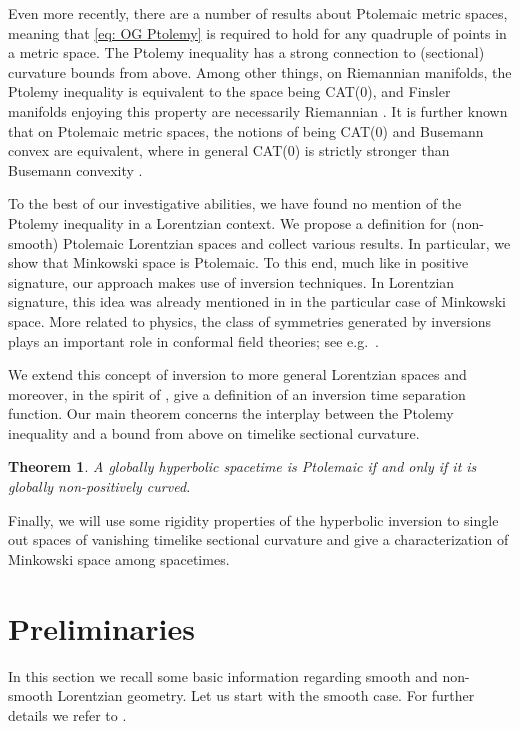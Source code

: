 \documentclass[hidelinks,12pt,a4paper]{article}
\numberwithin{equation}{section}
\theoremstyle{plain}
\newtheorem{theorem}[definition]{Theorem}
\theoremstyle{definition}
\begin{document}
Even more recently, there are a number of results about Ptolemaic metric spaces, meaning that \eqref{eq: OG Ptolemy} is required to hold for any quadruple of points in a metric space. 
The Ptolemy inequality has a strong connection to (sectional) curvature bounds from above. 
Among other things, on Riemannian manifolds, the Ptolemy inequality is equivalent to the space being CAT(0), and Finsler manifolds enjoying this property are necessarily Riemannian \cite{BuFaWra}. 
It is further known that on Ptolemaic metric spaces, the notions of being CAT(0) and Busemann convex are equivalent, where in general CAT(0) is strictly stronger than Busemann convexity \cite{FLS07}. 

To the best of our investigative abilities, we have found no mention of the Ptolemy inequality in a Lorentzian context. 
We propose a definition for (non-smooth) Ptolemaic Lorentzian spaces and collect various results. 
In particular, we show that Minkowski space is Ptolemaic. 
To this end, much like in positive signature, our approach makes use of inversion techniques. 
In Lorentzian signature, this idea was already mentioned in \cite{Chr} in the particular case of Minkowski space. More related to physics, the class of symmetries generated by inversions plays an important role in conformal field theories; see e.g.\ \cite{CFTbook}. 

We extend this concept of inversion to more general Lorentzian spaces and moreover, in the spirit of \cite{BHX08}, give a definition of an inversion time separation function. 
Our main theorem concerns the interplay between the Ptolemy inequality and a bound from above on timelike sectional curvature. 
\begin{theorem}
A globally hyperbolic spacetime is Ptolemaic if and only if it is globally non-positively curved.
\end{theorem}
Finally, we will use some rigidity properties of the hyperbolic inversion to single out spaces of vanishing timelike sectional curvature and give a characterization of Minkowski space among spacetimes.

\section{Preliminaries}
In this section we recall some basic information regarding smooth and non-smooth Lorentzian geometry. 
Let us start with the smooth case. 
For further details we refer to \cite{BeemBook, Min19}. 
\end{document}
